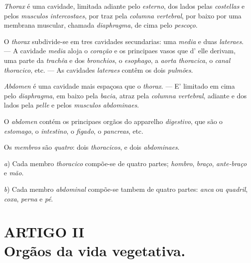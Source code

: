 
 
\emph{Thorax} é uma cavidade, limitada adiante pelo \emph{esterno}, dos lados pelas \emph{costellas} e pelos \emph{musculos intercostaes}, por traz pela \emph{columna vertebral}, por baixo por uma membrana muscular, chamada \emph{diaphragma}, de cima pelo \emph{pescoço}.

O \emph{thorax} subdivide-se em tres cavidades secundarias: uma \emph{media} e duas \emph{lateraes}. --- A cavidade \emph{media} aloja o \emph{coração} e os principaes vasos que d' elle derivam, uma parte da \emph{trachêa} e dos \emph{bronchios}, o \emph{esophago}, a \emph{aorta thoracica}, o \emph{canal thoracico}, etc. --- As cavidades \emph{lateraes} contêm os dois \emph{pulmões}.


\emph{Abdomen} é uma cavidade mais espaçosa que o \emph{thorax}. --- E' limitado em cima pelo \emph{diaphragma}, em baixo pela \emph{bacia}, atraz pela \emph{columna vertebral}, adiante e dos lados pela \emph{pelle} e pelos \emph{musculos abdominaes}.

O \emph{abdomen} contém os principaes orgãos do apparelho \emph{digestivo}, que são o \emph{estomago}, o \emph{intestino}, o \emph{figado}, o \emph{pancreas}, etc.


Os \emph{membros} são \emph{quatro}: dois \emph{thoracicos}, e dois \emph{abdominaes}.

\emph{a}) Cada membro \emph{thoracico} compõe-se de quatro partes; \emph{hombro}, \emph{braço}, \emph{ante-braço} e \emph{mão}.

\emph{b}) Cada membro \emph{abdominal} compõe-se tambem de quatro partes: \emph{anca} ou \emph{quadril}, \emph{coxa}, \emph{perna} e \emph{pé}.


\section*{ARTIGO II\\ Orgãos da vida vegetativa.}



